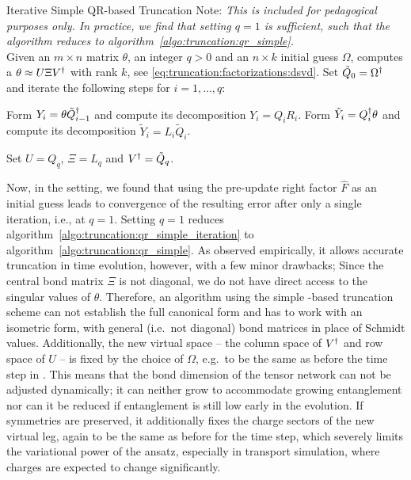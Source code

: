 \begin{Algorithm}{Iterative Simple QR-based Truncation}{
    Note: \emph{%
        This is included for pedagogical purposes only. In practice, we find that setting $q=1$ is sufficient, such that the algorithm reduces to algorithm~\ref{algo:truncation:qr_simple}.
    }
    \\[1ex]
    \label{algo:truncation:qr_simple_iteration}
    Given an $m \times n$ matrix $\theta$, an integer $q > 0$ and an $n \times k$ initial guess $\Omega$, computes a  $\theta \approx U \Xi V^\dagger$ with rank $k$, see \eqref{eq:truncation:factorizations:dsvd}.
}   
    \step Set $\tilde Q_0 = \Omega^\dagger$ and iterate the following steps for $i = 1, \dots, q$:
    \begin{substeps}
        \substep Form $Y_i = \theta \tilde{Q}_{i-1}^\dagger$ and compute its  decomposition $Y_i = Q_i R_i$.
        \substep Form $\tilde Y_i = Q_i^\dagger \theta$ and compute its  decomposition $\tilde Y_i = L_i \tilde Q_i$.
    \end{substeps}
    \step Set $U = Q_q$, $\Xi = L_q$ and $V^\dagger = \tilde Q_q$.
\end{Algorithm}

Now, in the  setting, we found that using the pre-update right factor $\hat F$ as an initial guess leads to convergence of the resulting error after only a single iteration, i.e., at $q=1$.
%
Setting $q=1$ reduces algorithm~\ref{algo:truncation:qr_simple_iteration} to algorithm~\ref{algo:truncation:qr_simple}.
%
As observed empirically, it allows accurate truncation in  time evolution, however, with a few minor drawbacks;
%
Since the central bond matrix $\Xi$ is not diagonal, we do not have direct access to the singular values of $\theta$.
%
Therefore, an  algorithm using the simple -based truncation scheme can not establish the full canonical form and has to work with an isometric form, with general (i.e.~not diagonal) bond matrices in place of Schmidt values.
%
Additionally, the new virtual space -- the column space of $V^\dagger$ and row space of $U$ -- is fixed by the choice of $\Omega$, e.g.~to be the same as before the time step in .
%
This means that the bond dimension of the tensor network can not be adjusted dynamically; it can neither grow to accommodate growing entanglement nor can it be reduced if entanglement is still low early in the evolution.
%
If symmetries are preserved, it additionally fixes the charge sectors of the new virtual leg, again to be the same as before for the time step, which severely limits the variational power of the ansatz, especially in transport simulation, where charges are expected to change significantly.

